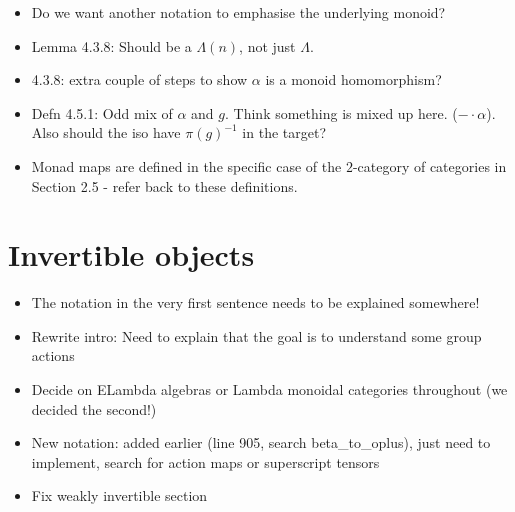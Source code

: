 \documentclass{amsart}
\begin{document}
\begin{itemize}
\item Do we want another notation to emphasise the underlying monoid?
\item Lemma 4.3.8: Should be a $\Lambda(n)$, not just $\Lambda$.
\item 4.3.8: extra couple of steps to show $\alpha$ is a monoid homomorphism?
\item Defn 4.5.1: Odd mix of $\alpha$ and $g$. Think something is mixed up here. ($- \cdot \alpha$). Also should the iso have $\pi(g)^{-1}$ in the target?
\item Monad maps are defined in the specific case of the $2$-category of categories in Section 2.5 - refer back to these definitions.
\end{itemize}



\section{ Invertible objects}

\begin{itemize}
\item The notation in the very first sentence needs to be explained somewhere!
\item Rewrite intro: Need to explain that the goal is to understand some group actions
\item Decide on ELambda algebras or Lambda monoidal categories throughout (we decided the second!)
\item New notation: added earlier (line 905, search beta\_to\_oplus), just need to implement, search for action maps or superscript tensors
\item Fix weakly invertible section
\end{itemize}
\end{document}
